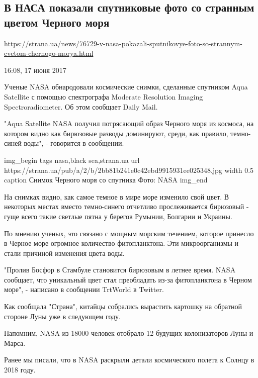  
 

\subsection{В НАСА показали спутниковые фото со странным цветом Черного моря}
\label{sec:17_06_2017.news.ua.strana.1_nasa_black_sea}

\url{https://strana.ua/news/76729-v-nasa-pokazali-sputnikovye-foto-so-strannym-cvetom-chernogo-morya.html}

16:08, 17 июня 2017

Ученые NASA обнародовали космические снимки, сделанные спутником Aqua Satellite
с помощью спектрографа Moderate Resolution Imaging Spectroradiometer. Об этом
сообщает Daily Mail.

"Aqua Satellite NASA получил потрясающий образ Черного моря из космоса, на
котором видно как бирюзовые разводы доминируют, среди, как правило, темно-синей
воды", - говорится в сообщении.

\ifcmt
img_begin 
	tags nasa,black sea,strana.ua
	url https://strana.ua/pub/a/2/b/2bb81b241e0c42ebd9915931ee025348.jpg
	width 0.5
	caption Снимок Черного моря со спутника Фото: NASA
img_end
\fi

На снимках видно, как самое темное в мире море изменило свой цвет. В некоторых
местах вместо темно-синего отчетливо прослеживается бирюзовый - гуще всего
такие светлые пятна у берегов Румынии, Болгарии и Украины.

По мнению ученых, это связано с мощным морским течением, которое принесло в
Черное море огромное количество фитопланктона. Эти микроорганизмы и стали
причиной изменения цвета воды.

"Пролив Босфор в Стамбуле становится бирюзовым в летнее время. NASA сообщает,
что уникальный цвет стал преобладать из-за фитопланктона в Черном море", -
написано в сообщении TrtWorld в Twitter.

Как сообщала "Страна", китайцы собрались вырастить картошку на обратной стороне
Луны уже в следующем году.

Напомним, NASA из 18000 человек отобрало 12 будущих колонизаторов Луны и Марса.

Ранее мы писали, что в NASA раскрыли детали космического полета к Солнцу в 2018
году.
